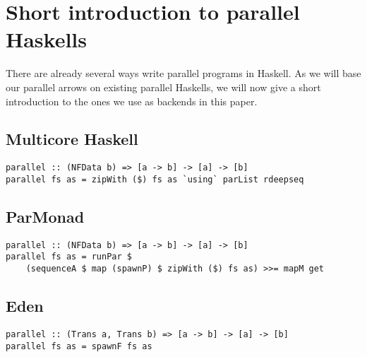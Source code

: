 \section{Short introduction to parallel Haskells}
There are already several ways write parallel programs in Haskell. As we will base our parallel arrows on existing parallel Haskells, we will now give a short introduction to the ones we use as backends in this paper.

\subsection{Multicore Haskell}

\begin{lstlisting}[frame=htrbl]
parallel :: (NFData b) => [a -> b] -> [a] -> [b]
parallel fs as = zipWith ($) fs as `using` parList rdeepseq
\end{lstlisting}

\subsection{ParMonad}

\begin{lstlisting}[frame=htrbl]
parallel :: (NFData b) => [a -> b] -> [a] -> [b]
parallel fs as = runPar $ 
	(sequenceA $ map (spawnP) $ zipWith ($) fs as) >>= mapM get
\end{lstlisting}

\subsection{Eden}

\begin{lstlisting}[frame=htrbl]
parallel :: (Trans a, Trans b) => [a -> b] -> [a] -> [b]
parallel fs as = spawnF fs as
\end{lstlisting}